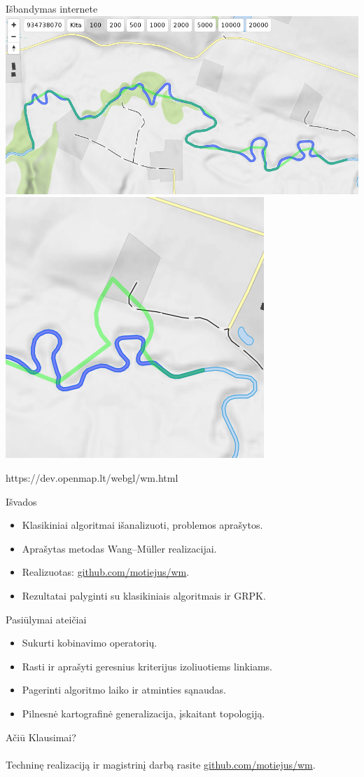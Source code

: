 \documentclass[14pt]{beamer}
\newcommand{\WM}{Wang--M{\"u}ller}
\begin{document}
\begin{frame}{Išbandymas internete}
  \centering
  \includegraphics[width=.75\textwidth]{openmap-wm-good.png}
  \includegraphics[width=.3\textwidth]{openmap-wm-bad.png}

  {\tiny https://dev.openmap.lt/webgl/wm.html}
\end{frame}

\begin{frame}{Išvados}
  \begin{itemize}
    \item Klasikiniai algoritmai išanalizuoti, problemos aprašytos.
    \item Aprašytas metodas {\WM} realizacijai.

    \item Realizuotas:
      \href{https://github.com/motiejus/wm}{github.com/motiejus/wm}.

    \item Rezultatai palyginti su klasikiniais algoritmais ir GRPK.
  \end{itemize}
\end{frame}

\begin{frame}{Pasiūlymai ateičiai}
  \begin{itemize}
    \item Sukurti kobinavimo operatorių.
    \item Rasti ir aprašyti geresnius kriterijus izoliuotiems linkiams.
    \item Pagerinti algoritmo laiko ir atminties sąnaudas.
    \item Pilnesnė kartografinė generalizacija, įskaitant topologiją.
  \end{itemize}
\end{frame}

\begin{frame}{Ačiū}
  Klausimai? \\ \\

  Techninę realizaciją ir magistrinį darbą rasite
      \href{https://github.com/motiejus/wm}{github.com/motiejus/wm}.
\end{frame}
\end{document}
